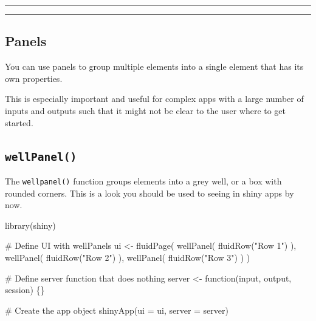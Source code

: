 \documentclass[
  letterpaper,
  DIV=11,
  numbers=noendperiod]{scrreprt}
\newenvironment{Shaded}{\begin{snugshade}}{\end{snugshade}}
\newcommand{\AttributeTok}[1]{\textcolor[rgb]{0.40,0.46,0.14}{#1}}
\newcommand{\CommentTok}[1]{\textcolor[rgb]{0.37,0.37,0.37}{#1}}
\newcommand{\ControlFlowTok}[1]{\textcolor[rgb]{0.00,0.46,0.62}{#1}}
\newcommand{\FunctionTok}[1]{\textcolor[rgb]{0.28,0.35,0.67}{#1}}
\newcommand{\NormalTok}[1]{\textcolor[rgb]{0.00,0.46,0.62}{#1}}
\newcommand{\OtherTok}[1]{\textcolor[rgb]{0.00,0.46,0.62}{#1}}
\newcommand{\StringTok}[1]{\textcolor[rgb]{0.13,0.47,0.30}{#1}}
\begin{document}
\begin{center}\rule{0.5\linewidth}{0.5pt}\end{center}

\begin{center}\rule{0.5\linewidth}{0.5pt}\end{center}

\hypertarget{panels}{%
\subsection{Panels}\label{panels}}

You can use panels to group multiple elements into a single element that
has its own properties.

This is especially important and useful for complex apps with a large
number of inputs and outputs such that it might not be clear to the user
where to get started.

\hypertarget{wellpanel}{%
\subsection{\texorpdfstring{\texttt{wellPanel()}}{wellPanel()}}\label{wellpanel}}

The \texttt{wellpanel()} function groups elements into a grey well, or a
box with rounded corners. This is a look you should be used to seeing in
shiny apps by now.

\begin{Shaded}
\begin{Highlighting}[]
\FunctionTok{library}\NormalTok{(shiny)}

\CommentTok{\# Define UI with wellPanels}
\NormalTok{ui }\OtherTok{\textless{}{-}} \FunctionTok{fluidPage}\NormalTok{(}
  \FunctionTok{wellPanel}\NormalTok{( }\FunctionTok{fluidRow}\NormalTok{(}\StringTok{"Row 1"}\NormalTok{) ),}
  \FunctionTok{wellPanel}\NormalTok{( }\FunctionTok{fluidRow}\NormalTok{(}\StringTok{"Row 2"}\NormalTok{) ),}
  \FunctionTok{wellPanel}\NormalTok{( }\FunctionTok{fluidRow}\NormalTok{(}\StringTok{"Row 3"}\NormalTok{) )}
\NormalTok{)}

\CommentTok{\# Define server function that does nothing}
\NormalTok{server }\OtherTok{\textless{}{-}} \ControlFlowTok{function}\NormalTok{(input, output, session) \{\}}

\CommentTok{\# Create the app object}
\FunctionTok{shinyApp}\NormalTok{(}\AttributeTok{ui =}\NormalTok{ ui, }\AttributeTok{server =}\NormalTok{ server)}
\end{Highlighting}
\end{Shaded}
\end{document}
